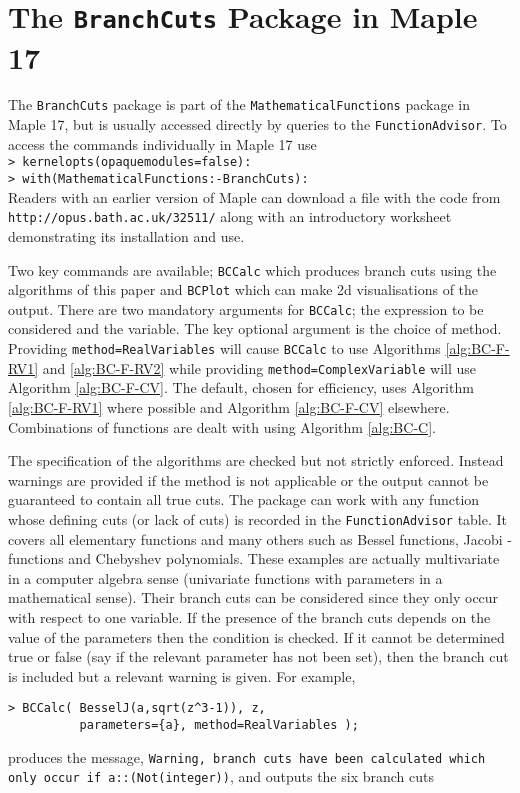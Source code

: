 \documentclass{llncs}
\begin{document}
\appendix

\section{The \texttt{BranchCuts} Package in {\sc Maple 17}} \label{APP:Maple}

The \texttt{BranchCuts} package is part of the \texttt{MathematicalFunctions} package in {\sc Maple 17}, but is usually accessed directly by queries to the \texttt{FunctionAdvisor}.  To access the commands individually in Maple 17 use \\
\texttt{> kernelopts(opaquemodules=false):} \\ 
\texttt{> with(MathematicalFunctions:-BranchCuts):} \\
Readers with an earlier version of {\sc Maple} can download a file with the code from \texttt{http://opus.bath.ac.uk/32511/} along with an introductory  worksheet demonstrating its installation and use. 

Two key commands are available; \texttt{BCCalc} which produces branch cuts using the algorithms of this paper and \texttt{BCPlot} which can make 2d visualisations of the output.  There are two mandatory arguments for \texttt{BCCalc}; the expression to be considered and the variable.  The key optional argument is the choice of method.  Providing \texttt{method=RealVariables} will cause \texttt{BCCalc} to use Algorithms \ref{alg:BC-F-RV1} and \ref{alg:BC-F-RV2} while providing \texttt{method=ComplexVariable} will use Algorithm \ref{alg:BC-F-CV}.  The default, chosen for efficiency, uses Algorithm \ref{alg:BC-F-RV1} where possible and Algorithm \ref{alg:BC-F-CV} elsewhere.  Combinations of functions are dealt with using Algorithm \ref{alg:BC-C}.

The specification of the algorithms are checked but not strictly enforced.  Instead warnings are provided if the method is not applicable or the output cannot be guaranteed to contain all true cuts.  The package can work with any function whose defining cuts (or lack of cuts) is recorded in the \texttt{FunctionAdvisor} table.  It covers all elementary functions and many others such as Bessel functions, Jacobi -functions and Chebyshev polynomials.  These examples are actually multivariate in a computer algebra sense (univariate functions with parameters in a mathematical sense).  Their branch cuts can be considered since they only occur with respect to one variable.  If the presence of the branch cuts depends on the value of the parameters then the condition is checked.  If it cannot be determined true or false (say if the relevant parameter has not been set), then the branch cut is included but a relevant warning is given.  
For example,
\begin{verbatim}
> BCCalc( BesselJ(a,sqrt(z^3-1)), z, 
          parameters={a}, method=RealVariables );
\end{verbatim}
produces the message, \verb+Warning, branch cuts have been calculated which+ \verb+only occur if a::(Not(integer))+,
and outputs the six branch cuts
\end{document}

